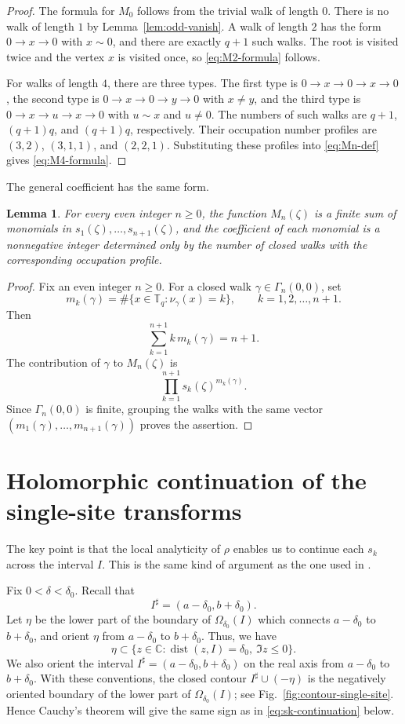 \documentclass[a4paper,11pt]{article}
\newtheorem{lem}[thm]{Lemma}
\begin{document}
\begin{proof}
The formula for $M_0$ follows from the trivial walk of length $0$.
There is no walk of length $1$ by Lemma~\ref{lem:odd-vanish}. 
A walk of length $2$ has the form $0\to x\to0$ with $x\sim0$, and there are
exactly $q+1$ such walks.
The root is visited twice and the vertex $x$ is visited once, so \eqref{eq:M2-formula} follows.

For walks of length $4$, there are three types. 
The first type is
$0\to x\to0\to x\to0$, the second type is
$0\to x\to0\to y\to0$ with $x\ne y$, and the third type is
$0\to x\to u\to x\to0$ with $u\sim x$ and $u\ne0$.
The numbers of such walks are $q+1$, $(q+1)q$, and $(q+1)q$, respectively. 
Their occupation number profiles are $(3,2)$, $(3,1,1)$, and $(2,2,1)$. 
Substituting these profiles into \eqref{eq:Mn-def} gives \eqref{eq:M4-formula}.
\end{proof}

The general coefficient has the same form.

\begin{lem}
\label{lem:coefficient-structure}
For every even integer $n\ge0$, the function $M_n(\zeta)$ is a finite
sum of monomials in $s_1(\zeta),\dots,s_{n+1}(\zeta)$, and the
coefficient of each monomial is a nonnegative integer determined only by
the number of closed walks with the corresponding occupation profile.
\end{lem}

\begin{proof}
Fix an even integer $n\ge0$. 
For a closed walk $\gamma\in\Gamma_n(0,0)$,
set
$$
m_k(\gamma)
=
\#\{x\in\mathbb T_q:\nu_\gamma(x)=k\},
\qquad
k=1,2,\dots,n+1.
$$
Then
$$
\sum_{k=1}^{n+1}k\,m_k(\gamma)=n+1.
$$
The contribution of $\gamma$ to $M_n(\zeta)$ is
$$
\prod_{k=1}^{n+1}s_k(\zeta)^{m_k(\gamma)}.
$$
Since $\Gamma_n(0,0)$ is finite, grouping the walks with the same vector
$(m_1(\gamma),\dots,m_{n+1}(\gamma))$ proves the assertion.
\end{proof}

\section{Holomorphic continuation of the single-site transforms}

The key point is that the local analyticity of $\rho$ enables us to
continue each $s_k$ across the interval $I$. 
This is the same kind of argument as the one used in \cite{KaminagaKrishnaNakamura2012}.

Fix $0<\delta<\delta_0$. 
Recall that
$$
I^\sharp=(a-\delta_0,b+\delta_0).
$$
Let $\eta$ be the lower part of the boundary of $\Omega_{\delta_0}(I)$
which connects $a-\delta_0$ to $b+\delta_0$, and orient $\eta$ from
$a-\delta_0$ to $b+\delta_0$. 
Thus, we have
$$
\eta \subset \{z\in\mathbb C:\operatorname{dist}(z,I)=\delta_0,\ \Im z\le 0\}.
$$
We also orient the interval $I^\sharp=(a-\delta_0,b+\delta_0)$ on the
real axis from $a-\delta_0$ to $b+\delta_0$. 
With these conventions, the closed contour $I^\sharp\cup(-\eta)$ is the negatively oriented boundary
of the lower part of $\Omega_{\delta_0}(I)$; see Fig.~\ref{fig:contour-single-site}.
Hence Cauchy's theorem will give the same sign as in \eqref{eq:sk-continuation} below.
\end{document}
